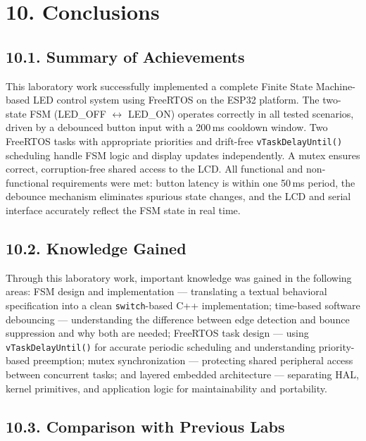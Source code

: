 \documentclass[12pt]{article}
\begin{document}
\section*{10. Conclusions}

\subsection*{10.1. Summary of Achievements}

This laboratory work successfully implemented a complete Finite State Machine-based LED control system using FreeRTOS on the ESP32 platform. The two-state FSM (LED\_OFF $\leftrightarrow$ LED\_ON) operates correctly in all tested scenarios, driven by a debounced button input with a 200\,ms cooldown window. Two FreeRTOS tasks with appropriate priorities and drift-free \texttt{vTaskDelayUntil()} scheduling handle FSM logic and display updates independently. A mutex ensures correct, corruption-free shared access to the LCD. All functional and non-functional requirements were met: button latency is within one 50\,ms period, the debounce mechanism eliminates spurious state changes, and the LCD and serial interface accurately reflect the FSM state in real time.

\subsection*{10.2. Knowledge Gained}

Through this laboratory work, important knowledge was gained in the following areas: FSM design and implementation — translating a textual behavioral specification into a clean \texttt{switch}-based C++ implementation; time-based software debouncing — understanding the difference between edge detection and bounce suppression and why both are needed; FreeRTOS task design — using \texttt{vTaskDelayUntil()} for accurate periodic scheduling and understanding priority-based preemption; mutex synchronization — protecting shared peripheral access between concurrent tasks; and layered embedded architecture — separating HAL, kernel primitives, and application logic for maintainability and portability.

\subsection*{10.3. Comparison with Previous Labs}
\end{document}
